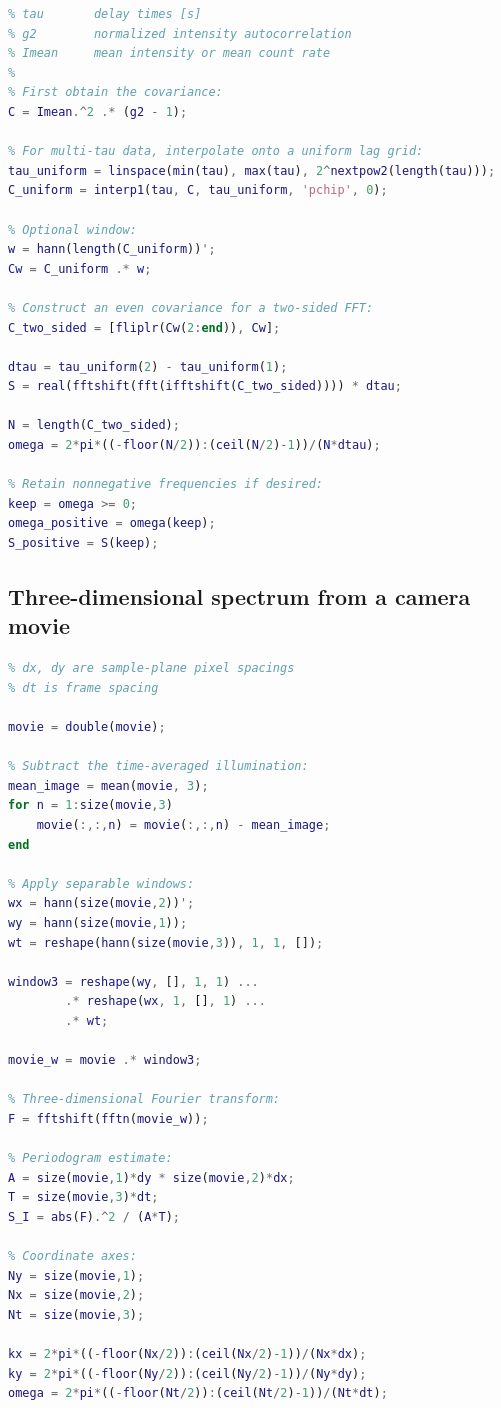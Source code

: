\documentclass[11pt]{article}
\begin{document}
\begin{lstlisting}[language=Matlab,
basicstyle=\ttfamily\small,
frame=single,
caption={MATLAB/Octave-style pseudocode for a temporal spectrum.}]
% Inputs:
% tau       delay times [s]
% g2        normalized intensity autocorrelation
% Imean     mean intensity or mean count rate
%
% First obtain the covariance:
C = Imean.^2 .* (g2 - 1);

% For multi-tau data, interpolate onto a uniform lag grid:
tau_uniform = linspace(min(tau), max(tau), 2^nextpow2(length(tau)));
C_uniform = interp1(tau, C, tau_uniform, 'pchip', 0);

% Optional window:
w = hann(length(C_uniform))';
Cw = C_uniform .* w;

% Construct an even covariance for a two-sided FFT:
C_two_sided = [fliplr(Cw(2:end)), Cw];

dtau = tau_uniform(2) - tau_uniform(1);
S = real(fftshift(fft(ifftshift(C_two_sided)))) * dtau;

N = length(C_two_sided);
omega = 2*pi*((-floor(N/2)):(ceil(N/2)-1))/(N*dtau);

% Retain nonnegative frequencies if desired:
keep = omega >= 0;
omega_positive = omega(keep);
S_positive = S(keep);
\end{lstlisting}

\subsection{Three-dimensional spectrum from a camera movie}

\begin{lstlisting}[language=Matlab,
basicstyle=\ttfamily\small,
frame=single,
caption={MATLAB/Octave-style pseudocode for
$\mathcal{S}_I(k_x,k_y,\omega)$.}]
% movie has dimensions Ny x Nx x Nt
% dx, dy are sample-plane pixel spacings
% dt is frame spacing

movie = double(movie);

% Subtract the time-averaged illumination:
mean_image = mean(movie, 3);
for n = 1:size(movie,3)
    movie(:,:,n) = movie(:,:,n) - mean_image;
end

% Apply separable windows:
wx = hann(size(movie,2))';
wy = hann(size(movie,1));
wt = reshape(hann(size(movie,3)), 1, 1, []);

window3 = reshape(wy, [], 1, 1) ...
        .* reshape(wx, 1, [], 1) ...
        .* wt;

movie_w = movie .* window3;

% Three-dimensional Fourier transform:
F = fftshift(fftn(movie_w));

% Periodogram estimate:
A = size(movie,1)*dy * size(movie,2)*dx;
T = size(movie,3)*dt;
S_I = abs(F).^2 / (A*T);

% Coordinate axes:
Ny = size(movie,1);
Nx = size(movie,2);
Nt = size(movie,3);

kx = 2*pi*((-floor(Nx/2)):(ceil(Nx/2)-1))/(Nx*dx);
ky = 2*pi*((-floor(Ny/2)):(ceil(Ny/2)-1))/(Ny*dy);
omega = 2*pi*((-floor(Nt/2)):(ceil(Nt/2)-1))/(Nt*dt);
\end{lstlisting}
\end{document}
